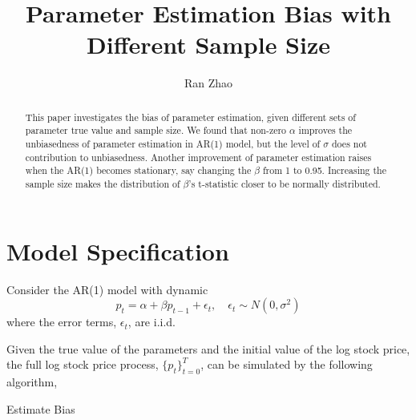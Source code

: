 \documentclass[11pt,reqno,final]{amsart}
\title{Parameter Estimation Bias with Different Sample Size}
\author{Ran Zhao}
\begin{document}
\begin{abstract}
This paper investigates the bias of parameter estimation, given different sets of parameter true value and sample size. We found that non-zero $\alpha$ improves the unbiasedness of parameter estimation in AR(1) model, but the level of $\sigma$ does not contribution to unbiasedness. Another improvement of parameter estimation raises when the AR(1) becomes stationary, say changing the $\beta$ from 1 to 0.95. Increasing the sample size makes the distribution of $\beta$'s t-statistic closer to be normally distributed. 
\end{abstract}

\maketitle
%
%
%
\section{Model Specification}
Consider the AR(1) model with dynamic
\begin{equation}\label{ar}
p_t = \alpha +  \beta p_{t-1} + \epsilon_t, \quad \epsilon_t \sim N(0, \sigma^2)
\end{equation}
where the error terms, $\epsilon_t$, are i.i.d.

Given the true value of the parameters and the initial value of the log stock price, the full log stock price process, $\{p_t\}_{t=0}^{T}$, can be simulated by the following algorithm,

\makeatletter
\def\BState{\State\hskip-\ALG@thistlm}
\makeatother

\begin{algorithm}
\caption{Estimate Bias}\label{algo}
\end{algorithm}
\end{document}

